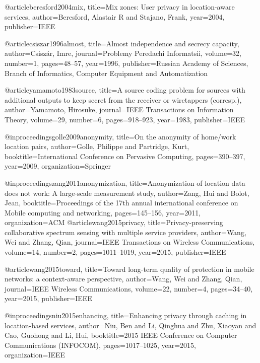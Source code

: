 {{@article{beresford2004mix,
  title={Mix zones: User privacy in location-aware services},
  author={Beresford, Alastair R and Stajano, Frank},
  year={2004},
  publisher={IEEE}
}


@article{csiszar1996almost,
  title={Almost independence and secrecy capacity},
  author={Csisz{\'a}r, Imre},
  journal={Problemy Peredachi Informatsii},
  volume={32},
  number={1},
  pages={48--57},
  year={1996},
  publisher={Russian Academy of Sciences, Branch of Informatics, Computer Equipment and Automatization}
}

@article{yamamoto1983source,
  title={A source coding problem for sources with additional outputs to keep secret from the receiver or wiretappers (corresp.)},
  author={Yamamoto, Hirosuke},
  journal={IEEE Transactions on Information Theory},
  volume={29},
  number={6},
  pages={918--923},
  year={1983},
  publisher={IEEE}
}



  @inproceedings{golle2009anonymity,
  title={On the anonymity of home/work location pairs},
  author={Golle, Philippe and Partridge, Kurt},
  booktitle={International Conference on Pervasive Computing},
  pages={390--397},
  year={2009},
  organization={Springer}
}

@inproceedings{zang2011anonymization,
  title={Anonymization of location data does not work: A large-scale measurement study},
  author={Zang, Hui and Bolot, Jean},
  booktitle={Proceedings of the 17th annual international conference on Mobile computing and networking},
  pages={145--156},
  year={2011},
  organization={ACM}
}
@article{wang2015privacy,
  title={Privacy-preserving collaborative spectrum sensing with multiple service providers},
  author={Wang, Wei and Zhang, Qian},
  journal={IEEE Transactions on Wireless Communications},
  volume={14},
  number={2},
  pages={1011--1019},
  year={2015},
  publisher={IEEE}
}

@article{wang2015toward,
  title={Toward long-term quality of protection in mobile networks: a context-aware perspective},
  author={Wang, Wei and Zhang, Qian},
  journal={IEEE Wireless Communications},
  volume={22},
  number={4},
  pages={34--40},
  year={2015},
  publisher={IEEE}
}

@inproceedings{niu2015enhancing,
  title={Enhancing privacy through caching in location-based services},
  author={Niu, Ben and Li, Qinghua and Zhu, Xiaoyan and Cao, Guohong and Li, Hui},
  booktitle={2015 IEEE Conference on Computer Communications (INFOCOM)},
  pages={1017--1025},
  year={2015},
  organization={IEEE}
}

}}

